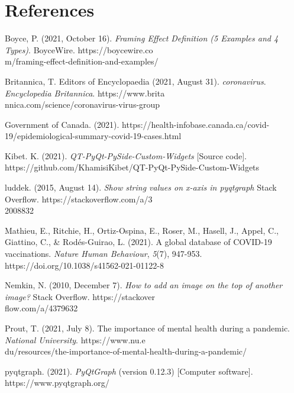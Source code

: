 \documentclass[fontsize=11pt]{article}
\begin{document}
    \section*{References}

    \hangindent=0.7cm \noindent
    Boyce, P. (2021, October 16). \textit{Framing Effect Definition (5 Examples and 4 Types)}. BoyceWire.
    https://boycewire.co\\m/framing-effect-definition-and-examples/

    \hangindent=0.7cm \noindent
    Britannica, T. Editors of Encyclopaedia (2021, August 31). \textit{coronavirus}. \textit{Encyclopedia Britannica}.
    https://www.brita\\nnica.com/science/coronavirus-virus-group

    \hangindent=0.7cm \noindent
    Government of Canada. (2021).
    https://health-infobase.canada.ca/covid-19/epidemiological-summary-covid-19-cases.html

    \hangindent=0.7cm \noindent
    Kibet. K. (2021). \textit{QT-PyQt-PySide-Custom-Widgets} [Source code].
    https://github.com/KhamisiKibet/QT-PyQt-PySide-Custom-Widgets

    \hangindent=0.7cm \noindent
    luddek. (2015, August 14). \textit{Show string values on x-axis in pyqtgraph} Stack Overflow.
    https://stackoverflow.com/a/3\\2008832

    \hangindent=0.7cm \noindent
    Mathieu, E., Ritchie, H., Ortiz-Ospina, E., Roser, M., Hasell, J., Appel, C., Giattino, C., \& Rodés-Guirao, L. (2021). A global database of COVID-19 vaccinations. \textit{Nature Human Behaviour}, \textit{5}(7), 947-953. \\
    https://doi.org/10.1038/s41562-021-01122-8

    \hangindent=0.7cm \noindent
    Nemkin, N. (2010, December 7). \textit{How to add an image on the top of another image?} Stack Overflow.
    https://stackover\\flow.com/a/4379632

    \hangindent=0.7cm \noindent
    Prout, T. (2021, July 8). The importance of mental health during a pandemic. \textit{National University}.
    https://www.nu.e\\du/resources/the-importance-of-mental-health-during-a-pandemic/

    \hangindent=0.7cm \noindent
    pyqtgraph. (2021). \textit{PyQtGraph} (version 0.12.3) [Computer software].
    https://www.pyqtgraph.org/
\end{document}
